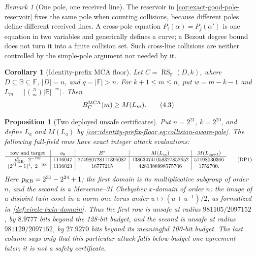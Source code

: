 \documentclass[11pt,a4paper]{amsart}
\numberwithin{equation}{section}
\newtheorem{proposition}[proposition]{Proposition}
\newtheorem{corollary}[corollary]{Corollary}
\theoremstyle{remark}
\newtheorem{remark}[remark]{Remark}
\DeclareMathOperator{\RS}{RS}
\newcommand{\F}{\mathbb F}
\newcommand{\B}{\mathbb B}
\newcommand{\abs}[1]{\lvert #1\rvert}
\begin{document}
\begin{remark}[One pole, one received line]
The reservoir in \cref{cor:exact-good-pole-reservoir} fixes the same pole
when counting collisions, because different poles define different
received lines.  A cross-pole equation
\(P_i(\alpha)=P_j(\alpha')\) is one equation in two variables and
generically defines a curve; a Bezout degree bound does not turn it into a
finite collision set.  Such cross-line collisions are neither controlled
by the simple-pole argument nor needed by it.
\end{remark}

\begin{corollary}[Identity-prefix MCA floor]\label{cor:identity-prefix-floor}
Let \(C=\RS_\F(D,k)\), where
\(D\subseteq\B\subseteq\F\), \(\abs D=n\), and
\(q=\abs\F>n\).  For \(k+1\le m\le n\), put \(w=m-k-1\) and
\(L_m=\lceil\binom nm\abs\B^{-w}\rceil\).  Then
\[
 B_C^{\rm MCA}(m)\ge M(L_m).
 \tag{4.3}\label{eq:identity-prefix-floor}
\]
\end{corollary}


\begin{proposition}[Two deployed unsafe certificates]
\label{prop:deployed-prefix-attacks}
Put \(n=2^{21}\), \(k=2^{20}\), and define \(L_a\) and \(M(L_a)\) by
\cref{cor:identity-prefix-floor,eq:collision-aware-pole}.  The following
full-field rows have exact integer attack evaluations:
\[
\begin{array}{c|c|c|c|c}
\text{row and target}&a_0&B^*&M(L_{a_0})&M(L_{a_0+1})\\ \hline
p_{\rm KB}^6,\ 2^{-128}&1116047&
274980728111395087&138634741058327852652&57198030366\\
(2^{31}-1)^4,\ 2^{-100}&1116023&
16777215&4281388998575706&1752700 .
\end{array}                                       \tag{DP1}
 \label{eq:deployed-prefix-attacks}
\]
Here \(p_{\rm KB}=2^{31}-2^{24}+1\); the first domain is its
multiplicative subgroup of order \(n\), and the second is a
Mersenne--31 Chebyshev \(x\)-domain of order \(n\): the image of a disjoint
twin coset in a norm-one torus under \(u\mapsto(u+u^{-1})/2\), as formalized
in \cref{def:circle-twin-domain}.
Thus the first row is unsafe at radius \(981105/2097152\), by
\(8.9777\) bits beyond the 128-bit budget, and the second is unsafe at
radius \(981129/2097152\), by \(27.9270\) bits beyond its meaningful
100-bit budget.  The last column says only that this particular attack
falls below budget one agreement later; it is not a safety certificate.
\end{proposition}
\end{document}
